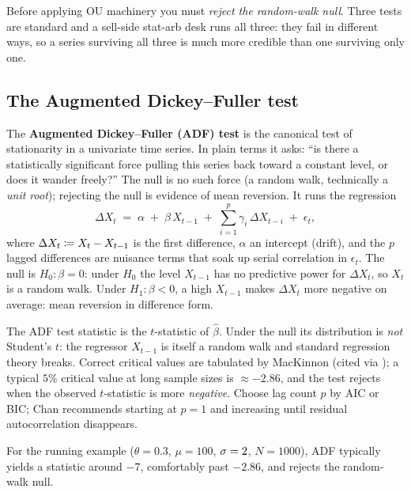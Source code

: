 Before applying OU machinery you must \emph{reject the
random-walk null}. Three tests are standard and a sell-side
stat-arb desk runs all three: they fail in different ways, so a
series surviving all three is much more credible than one
surviving only one.

\subsection{The Augmented Dickey--Fuller test}
\label{subsec:ch9_adf}

The \textbf{Augmented Dickey--Fuller (ADF) test} is the canonical
test of stationarity in a univariate time series. In plain terms
it asks: ``is there a statistically significant force pulling
this series back toward a constant level, or does it wander
freely?'' The null is no such force (a random walk, technically a
\emph{unit root}); rejecting the null is evidence of mean
reversion. It runs the regression
\begin{equation}
  \Delta X_t \;=\; \alpha
                  \;+\; \beta\,X_{t-1}
                  \;+\; \sum_{i=1}^p \gamma_i\,\Delta X_{t-i}
                  \;+\; \epsilon_t,
  \label{eq:adf_regression}
\end{equation}
where $\Delta X_t \coloneqq X_t - X_{t-1}$ is the first difference,
$\alpha$ an intercept (drift), and the $p$ lagged differences are
nuisance terms that soak up serial correlation in $\epsilon_t$.
The null is $H_0\colon \beta = 0$: under $H_0$ the level
$X_{t-1}$ has no predictive power for $\Delta X_t$, so $X_t$ is a
random walk. Under $H_1\colon \beta < 0$, a high $X_{t-1}$ makes
$\Delta X_t$ more negative on average: mean reversion in
difference form.

The ADF test statistic is the $t$-statistic of $\hat\beta$. Under
the null its distribution is \emph{not} Student's $t$: the
regressor $X_{t-1}$ is itself a random walk and standard
regression theory breaks. Correct critical values are tabulated
by MacKinnon (cited via \citeChan); a typical $5\%$ critical
value at long sample sizes is $\approx -2.86$, and the test
rejects when the observed $t$-statistic is more \emph{negative}.
Choose lag count $p$ by AIC or BIC; Chan recommends starting at
$p = 1$ and increasing until residual autocorrelation
disappears.

For the running example ($\theta = 0.3$, $\mu = 100$,
$\sigma = 2$, $N = 1000$), ADF typically yields a statistic
around $-7$, comfortably past $-2.86$, and rejects the
random-walk null.

